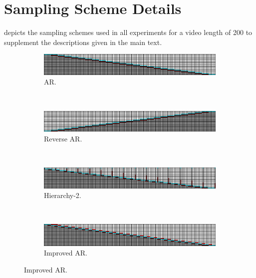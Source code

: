 \chapter{Sampling Scheme Details} \label{app:sampling-schemes}
 depicts the sampling schemes used in all experiments for a video length of 200 to supplement the descriptions given in the main text.

\begin{figure}[t!]
    \centering
    \begin{subfigure}[t]{\textwidth}
        \centering
        \includegraphics[width=\textwidth]{figures/big-sampling-scheme-visualizations/autoreg.png}
        \caption{AR.}
        \label{fig:ar-app}
    \end{subfigure}
    ~
    \begin{subfigure}[t]{\textwidth}
        \centering
        \includegraphics[width=\textwidth]{figures/big-sampling-scheme-visualizations/reverse-autoreg.png}
        \caption{Reverse AR.}
        \label{fig:reverse-ar-app}
    \end{subfigure}
    ~
    \begin{subfigure}[t]{\textwidth}
        \centering
        \includegraphics[width=\textwidth]{figures/big-sampling-scheme-visualizations/hierarchy-2.png}
        \caption{Hierarchy-2.}
        \label{fig:h2-app}
    \end{subfigure}
    ~
    \begin{subfigure}[t]{\textwidth}
        \centering
        \includegraphics[width=\textwidth]{figures/big-sampling-scheme-visualizations/autoregressive-with-near-future.png}
        \caption{Improved AR.}
        \label{fig:improved-ar-app}

\end{subfigure}
\end{figure}
